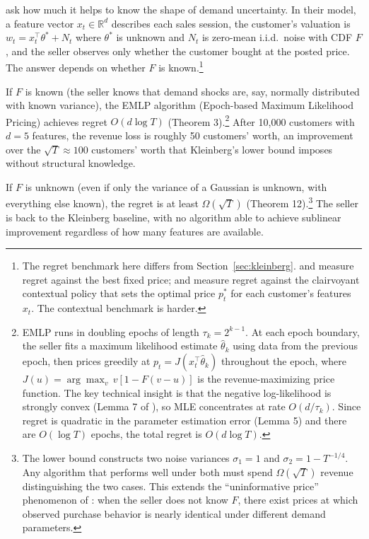 \citet{Xu2021} ask how much it helps to know the shape of demand uncertainty. In their model, a feature vector $x_t \in \mathbb{R}^d$ describes each sales session, the customer's valuation is $w_t = x_t^\top \theta^* + N_t$ where $\theta^*$ is unknown and $N_t$ is zero-mean i.i.d.\ noise with CDF $F$, and the seller observes only whether the customer bought at the posted price. The answer depends on whether $F$ is known.\footnote{The regret benchmark here differs from Section~\ref{sec:kleinberg}. \citet{Kleinberg2003} and \citet{Broder2012} measure regret against the best fixed price; \citet{Xu2021} and \citet{Liu2024strategic} measure regret against the clairvoyant contextual policy that sets the optimal price $p_t^*$ for each customer's features $x_t$. The contextual benchmark is harder.}

If $F$ is known (the seller knows that demand shocks are, say, normally distributed with known variance), the EMLP algorithm (Epoch-based Maximum Likelihood Pricing) achieves regret $O(d \log T)$ (Theorem 3).\footnote{EMLP runs in doubling epochs of length $\tau_k = 2^{k-1}$. At each epoch boundary, the seller fits a maximum likelihood estimate $\hat{\theta}_k$ using data from the previous epoch, then prices greedily at $p_t = J(x_t^\top \hat{\theta}_k)$ throughout the epoch, where $J(u) = \arg\max_v \, v[1 - F(v - u)]$ is the revenue-maximizing price function. The key technical insight is that the negative log-likelihood is strongly convex (Lemma 7 of \citet{Xu2021}), so MLE concentrates at rate $O(d / \tau_k)$. Since regret is quadratic in the parameter estimation error (Lemma 5) and there are $O(\log T)$ epochs, the total regret is $O(d \log T)$.} After 10,000 customers with $d = 5$ features, the revenue loss is roughly 50 customers' worth, an improvement over the $\sqrt{T} \approx 100$ customers' worth that Kleinberg's lower bound imposes without structural knowledge.

If $F$ is unknown (even if only the variance of a Gaussian is unknown, with everything else known), the regret is at least $\Omega(\sqrt{T})$ (Theorem 12).\footnote{The lower bound constructs two noise variances $\sigma_1 = 1$ and $\sigma_2 = 1 - T^{-1/4}$. Any algorithm that performs well under both must spend $\Omega(\sqrt{T})$ revenue distinguishing the two cases. This extends the ``uninformative price'' phenomenon of \citet{Broder2012}: when the seller does not know $F$, there exist prices at which observed purchase behavior is nearly identical under different demand parameters.} The seller is back to the Kleinberg baseline, with no algorithm able to achieve sublinear improvement regardless of how many features are available.

